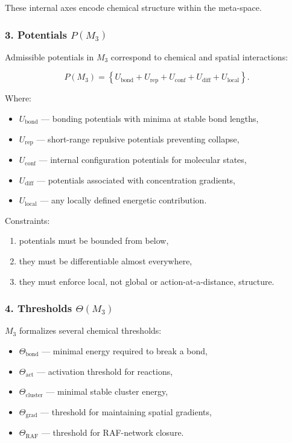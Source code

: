 These internal axes encode chemical structure within the meta-space.

\subsubsection*{3. Potentials \texorpdfstring{$P(M_3)$}{P(M_3)}}

Admissible potentials in $M_3$ correspond to chemical and spatial interactions:

\[
P(M_3)
=
\left\{
U_{\mathrm{bond}} + U_{\mathrm{rep}} + U_{\mathrm{conf}}
+ U_{\mathrm{diff}} + U_{\mathrm{local}}
\right\}.
\]

Where:

\begin{itemize}
    \item $U_{\mathrm{bond}}$ — bonding potentials with minima at stable bond lengths,
    \item $U_{\mathrm{rep}}$ — short-range repulsive potentials preventing collapse,
    \item $U_{\mathrm{conf}}$ — internal configuration potentials for molecular states,
    \item $U_{\mathrm{diff}}$ — potentials associated with concentration gradients,
    \item $U_{\mathrm{local}}$ — any locally defined energetic contribution.
\end{itemize}

Constraints:

\begin{enumerate}
    \item potentials must be bounded from below,
    \item they must be differentiable almost everywhere,
    \item they must enforce local, not global or action-at-a-distance, structure.
\end{enumerate}

\subsubsection*{4. Thresholds \texorpdfstring{$\Theta(M_3)$}{\Theta(M_3)}}

$M_3$ formalizes several chemical thresholds:

\begin{itemize}
    \item $\Theta_{\mathrm{bond}}$ — minimal energy required to break a bond,
    \item $\Theta_{\mathrm{act}}$ — activation threshold for reactions,
    \item $\Theta_{\mathrm{cluster}}$ — minimal stable cluster energy,
    \item $\Theta_{\mathrm{grad}}$ — threshold for maintaining spatial gradients,
    \item $\Theta_{\mathrm{RAF}}$ — threshold for RAF-network closure.
\end{itemize}

